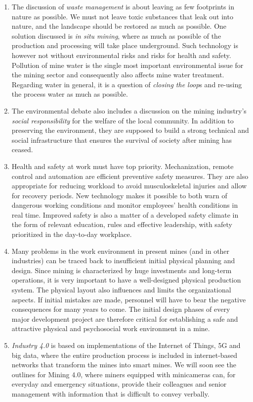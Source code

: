 \documentclass[
  12pt,
]{scrbook}
\begin{document}
\begin{enumerate}
\item
  The discussion of \emph{waste management} is about leaving as few footprints in nature as possible. We must not leave toxic substances that leak out into nature, and the landscape should be restored as much as possible. One solution discussed is \emph{in situ mining}, where as much as possible of the production and processing will take place underground. Such technology is however not without environmental risks and risks for health and safety. Pollution of mine water is the single most important environmental issue for the mining sector and consequently also affects mine water treatment. Regarding water in general, it is a question of \emph{closing the loop}s and re-using the process water as much as possible.
\item
  The environmental debate also includes a discussion on the mining industry's \emph{social responsibility} for the welfare of the local community. In addition to preserving the environment, they are supposed to build a strong technical and social infrastructure that ensures the survival of society after mining has ceased.
\item
  Health and safety at work must have top priority. Mechanization, remote control and automation are efficient preventive safety measures. They are also appropriate for reducing workload to avoid musculoskeletal injuries and allow for recovery periods. New technology makes it possible to both warn of dangerous working conditions and monitor employees' health conditions in real time. Improved safety is also a matter of a developed safety climate in the form of relevant education, rules and effective leadership, with safety prioritized in the day-to-day workplace.
\item
  Many problems in the work environment in present mines (and in other industries) can be traced back to insufficient initial physical planning and design. Since mining is characterized by huge investments and long-term operations, it is very important to have a well-designed physical production system. The physical layout also influences and limits the organizational aspects. If initial mistakes are made, personnel will have to bear the negative consequences for many years to come. The initial design phases of every major development project are therefore critical for establishing a safe and attractive physical and psychosocial work environment in a mine.
\item
  \emph{Industry 4.0} is based on implementations of the Internet of Things, 5G and big data, where the entire production process is included in internet-based networks that transform the mines into smart mines. We will soon see the outlines for Mining 4.0, where miners equipped with minicameras can, for everyday and emergency situations, provide their colleagues and senior management with information that is difficult to convey verbally.

\end{enumerate}
\end{document}
